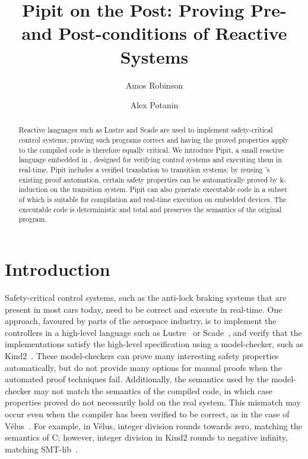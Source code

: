 \documentclass[a4paper,UKenglish,cleveref, autoref, thm-restate,anonymous]{lipics-v2021}
\title{Pipit on the Post: Proving Pre- and Post-conditions of Reactive Systems}
\author{Amos Robinson}{Australian National University, Canberra, Australia}{amos.robinson@anu.edu.au}{https://orcid.org/0009-0004-4837-4981}{}
\author{Alex Potanin}{Australian National University, Canberra, Australia}{alex.potanin@anu.edu.au}{https://orcid.org/0000-0002-4242-2725}{}
\begin{document}
\maketitle

\begin{abstract}
  Reactive languages such as Lustre and Scade are used to implement safety-critical control systems; proving such programs correct and having the proved properties apply to the compiled code is therefore equally critical.
  We introduce Pipit, a small reactive language embedded in \fstar{}, designed for verifying control systems and executing them in real-time.
  Pipit includes a verified translation to transition systems; by reusing \fstar{}'s existing proof automation, certain safety properties can be automatically proved by k-induction on the transition system.
  Pipit can also generate executable code in a subset of \fstar{} which is suitable for compilation and real-time execution on embedded devices.
  The executable code is deterministic and total and preserves the semantics of the original program.
\end{abstract}




\section{Introduction}
Safety-critical control systems, such as the anti-lock braking systems that are present in most cars today, need to be correct and execute in real-time.
One approach, favoured by parts of the aerospace industry, is to implement the controllers in a high-level language such as Lustre~\cite{caspi1995functional} or Scade~\cite{colaco2017scade}, and verify that the implementations satisfy the high-level specification using a model-checker, such as Kind2~\cite{champion2016kind2}.
These model-checkers can prove many interesting safety properties automatically, but do not provide many options for manual proofs when the automated proof techniques fail.
Additionally, the semantics used by the model-checker may not match the semantics of the compiled code, in which case properties proved do not necessarily hold on the real system.
This mismatch may occur even when the compiler has been verified to be correct, as in the case of Vélus~\cite{bourke2017formally}.
For example, in Vélus, integer division rounds towards zero, matching the semantics of C; however, integer division in Kind2 rounds to negative infinity, matching SMT-lib~\cite{BarFT2016SMTLIB,kind2023intdiv}.
\end{document}
